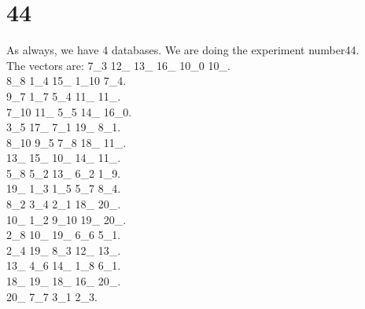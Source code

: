 \chapter{44}
\indent As always, we have 4 databases. We are doing the experiment number44.\\
The vectors are:
7\_3 12\_ 13\_ 16\_ 10\_0 10\_.\\8\_8 1\_4 15\_ 1\_10 7\_4.\\9\_7 1\_7 5\_4 11\_ 11\_.\\7\_10 11\_ 5\_5 14\_ 16\_0.\\3\_5 17\_ 7\_1 19\_ 8\_1.\\8\_10 9\_5 7\_8 18\_ 11\_.\\13\_ 15\_ 10\_ 14\_ 11\_.\\5\_8 5\_2 13\_ 6\_2 1\_9.\\19\_ 1\_3 1\_5 5\_7 8\_4.\\8\_2 3\_4 2\_1 18\_ 20\_.\\10\_ 1\_2 9\_10 19\_ 20\_.\\2\_8 10\_ 19\_ 6\_6 5\_1.\\2\_4 19\_ 8\_3 12\_ 13\_.\\13\_ 4\_6 14\_ 1\_8 6\_1.\\18\_ 19\_ 18\_ 16\_ 20\_.\\20\_ 7\_7 3\_1 2\_3.\\
